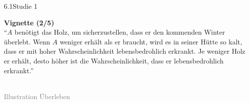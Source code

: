 \documentclass[xcolor=table,9pt,aspectratio=169]{beamer}
\begin{document}
\begin{frame}{\vspace*{10mm}6.1\hspace*{1em}Studie 1}
\begin{multicols}{2}
   \textbf{Vignette (2/5)}\\
   \medskip
   \enquote{$A$ benötigt das Holz, um sicherzustellen, dass er den kommenden Winter überlebt. Wenn $A$ weniger erhält als er braucht, wird es in seiner Hütte so kalt, dass er mit hoher Wahrscheinlichkeit lebensbedrohlich erkrankt. Je weniger Holz er erhält, desto höher ist die Wahrscheinlichkeit, dass er lebensbedrohlich erkrankt.}
   \vfill
   \begin{center}
      \\
      \footnotesize{\textcolor{gray}{Illustration Überleben}}
   \end{center}
\end{multicols}
\end{frame}
\end{document}
